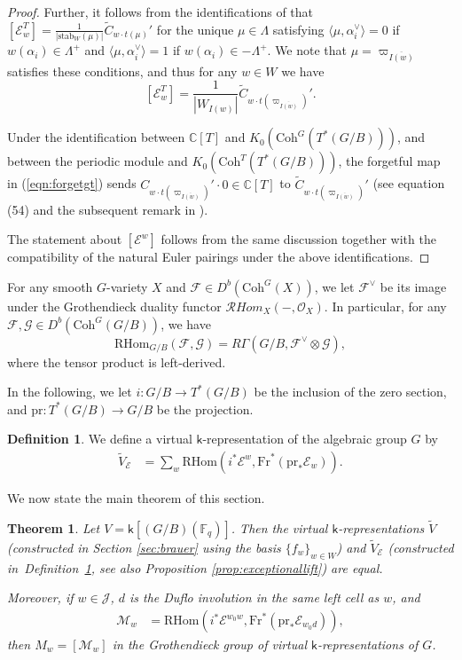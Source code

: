 \documentclass{amsart}
\newtheorem{theorem}[thm]{Theorem}
\theoremstyle{definition}
\newtheorem{defn}[thm]{Definition}
\begin{document}
\begin{proof}
    Further, it follows from the identifications of \cite{BM, Lk2} that $[\mathcal{E}_w^T] = \frac{1}{|\mathrm{stab}_W(\mu)|}\tilde{C}_{w \cdot t(\mu)}'$ for the unique $\mu \in \Lambda$ satisfying $\langle \mu, \alpha_i^\vee\rangle = 0$ if $w(\alpha_i) \in \Lambda^+$ and $\langle \mu, \alpha_i^\vee\rangle = 1$ if $w(\alpha_i) \in -\Lambda^+$. We note that $\mu = \varpi_{\overline{I(w)}}$ satisfies these conditions, and thus for any $w \in W$ we have
    \[
    [\mathcal{E}_w^T] = \frac{1}{|W_{I(w)}|}\tilde{C}_{w \cdot t(\varpi_{\overline{I(w)}})}'.
    \]

    Under the identification between $\mathbb{C}[T]$ and $K_0(\mathrm{Coh}^G(T^*(G/B)))$, and between the periodic module and $K_0(\mathrm{Coh}^T(T^*(G/B)))$, the forgetful map in (\ref{eqn:forgetgt}) sends $C_{w \cdot t(\varpi_{\overline{I(w)}})}' \cdot 0 \in \mathbb{C}[T]$ to $\tilde{C}_{w \cdot t(\varpi_{\overline{I(w)}})}'$ (see equation (54) and the subsequent remark in \cite[\S 6.1.8]{ABBGM}). 

    The statement about $[\mathcal{E}^w]$ follows from the same discussion together with the compatibility of the natural Euler pairings under the above identifications.
\end{proof}
For any smooth $G$-variety $X$ and $\mathcal{F} \in D^b(\mathrm{Coh}^G(X))$, we let $\mathcal{F}^\vee$ be its image under the Grothendieck duality functor $\mathcal{R}Hom_X(-, \mathcal{O}_{X})$. In particular, for any $\mathcal{F}, \mathcal{G} \in D^b(\mathrm{Coh}^G(G/B))$, we have
\[
\mathrm{RHom}_{G/B}(\mathcal{F}, \mathcal{G}) = R\Gamma(G/B, \mathcal{F}^\vee\otimes \mathcal{G}),
\]
where the tensor product is left-derived.

In the following, we let $i : G/B \to T^*(G/B)$ be the inclusion of the zero section, and $\mathrm{pr} : T^*(G/B) \to G/B$ be the projection. 
\begin{defn}\label{def:ve}
    We define a virtual $\mathsf{k}$-representation of the algebraic group $G$ by
    \begin{align}
        \tilde{V}_\mathcal{E} & = \sum_{w} \mathrm{RHom}(i^*\mathcal{E}^{w}, \mathrm{Fr}^*(\mathrm{pr}_*\mathcal{E}_{w})).
    \end{align}
\end{defn}

We now state the main theorem of this section.
\begin{theorem}\label{thm:twolifts}
    Let $V = \mathsf{k}[(G/B)(\mathbb{F}_q)]$. Then the virtual $\mathsf{k}$-representations $\tilde{V}$ (constructed in Section \ref{sec:brauer} using the basis $\{f_w\}_{w \in W}$) and $\tilde{V}_{\mathcal{E}}$ (constructed in~Definition~\ref{def:ve}, see also Proposition \ref{prop:exceptionallift}) are equal.

    Moreover, if $w \in \mathcal{J}$, $d$ is the Duflo involution in the same left cell as $w$, and
    \begin{align}
        \mathcal{M}_w & = \mathrm{RHom}(i^*\mathcal{E}^{w_0w}, \mathrm{Fr}^*(\mathrm{pr}_*\mathcal{E}_{w_0d})),
    \end{align}
    then $M_w = [\mathcal{M}_w]$ in the Grothendieck group of virtual $\mathsf{k}$-representations of $G$.
\end{theorem}
\end{document}

